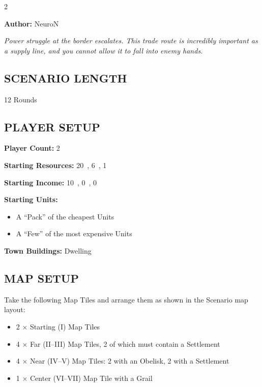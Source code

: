 
\begin{multicols*}{2}

\textbf{Author:} NeuroN

\textit{Power struggle at the border escalates. This trade route is incredibly important as a supply line, and you cannot allow it to fall into enemy hands.}

\subsection*{\MakeUppercase{Scenario Length}}
12 Rounds

\subsection*{\MakeUppercase{Player Setup}}
\textbf{Player Count:} 2

\textbf{Starting Resources:} 20~, 6~, 1~

\textbf{Starting Income:} 10~, 0~, 0~

\textbf{Starting Units:}

\begin{itemize}
  \item A ``Pack'' of the cheapest  Units
  \item A ``Few'' of the most expensive  Units
\end{itemize}

\textbf{Town Buildings:}  Dwelling

\subsection*{\MakeUppercase{Map Setup}}

Take the following Map Tiles and arrange them as shown in the Scenario map layout:

\begin{itemize}
  \item 2 × Starting (I) Map Tiles
  \item 4 × Far (II--III) Map Tiles, 2 of which must contain a Settlement
  \item 4 × Near (IV--V) Map Tiles: 2 with an Obelisk, 2 with a Settlement
  \item 1 × Center (VI--VII) Map Tile with a Grail
\end{itemize}


\end{multicols*}
